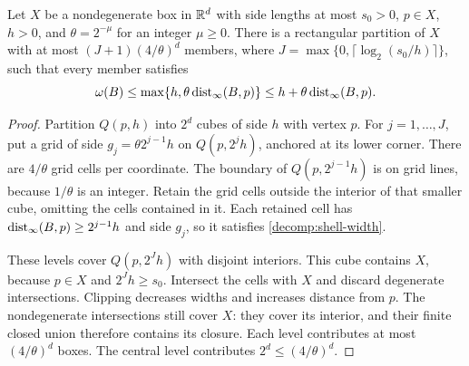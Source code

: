 \begin{lemma}\label{decomp:shells}
Let $X$ be a nondegenerate box in $\mathbb{R}^d$ with side lengths at most $s_0>0$,
$p\in X$, $h>0$, and $\theta=2^{-\mu}$ for an integer $\mu\ge0$.
There is a rectangular partition of $X$ with at most
$(J+1)(4/\theta)^d$ members, where
$J=\max\{0,\lceil\log_2(s_0/h)\rceil\}$, such that every member satisfies
\begin{equation}\label{decomp:shell-width}
 \omega(B)\le\max\{h,\theta\operatorname{dist}_\infty(B,p)\}
              \le h+\theta\operatorname{dist}_\infty(B,p).
\end{equation}
\end{lemma}
\begin{proof}
Partition $Q(p,h)$ into $2^d$ cubes of side $h$ with vertex $p$.
For $j=1,\ldots,J$, put a grid of side
$g_j=\theta2^{j-1}h$ on $Q(p,2^jh)$, anchored at its lower corner.
There are $4/\theta$ grid cells per coordinate. The boundary of
$Q(p,2^{j-1}h)$ is on grid lines, because $1/\theta$ is an integer.
Retain the grid cells outside the interior of that smaller cube, omitting
the cells contained in it. Each retained cell has
$\operatorname{dist}_\infty(B,p)\ge2^{j-1}h$ and side $g_j$, so it satisfies
\eqref{decomp:shell-width}.

These levels cover $Q(p,2^Jh)$ with disjoint interiors. This cube contains
$X$, because $p\in X$ and $2^Jh\ge s_0$. Intersect the cells with $X$ and
discard degenerate intersections. Clipping decreases widths and increases
distance from $p$. The nondegenerate intersections still cover $X$:
they cover its interior, and their finite closed union therefore contains
its closure. Each level contributes at most $(4/\theta)^d$ boxes.
The central level contributes $2^d\le(4/\theta)^d$.
\end{proof}

